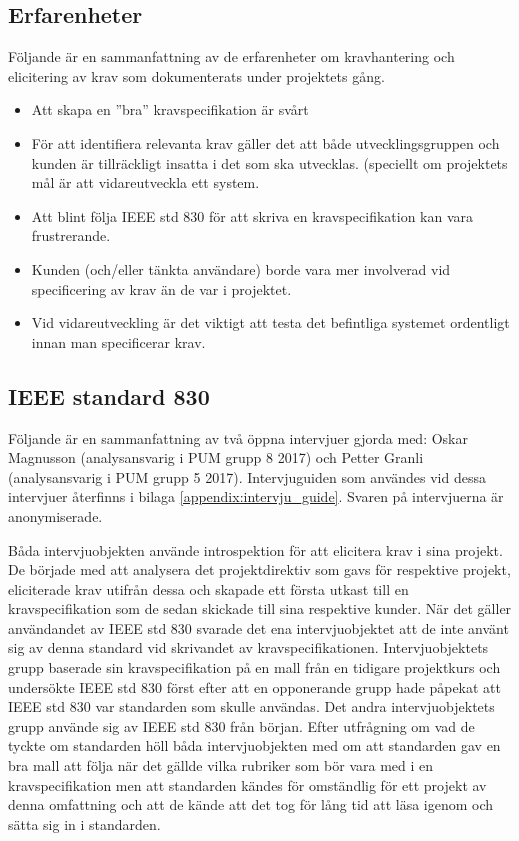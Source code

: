 \subsection{Erfarenheter}
\label{sec:expreience-jannering}
Följande är en sammanfattning av de erfarenheter om kravhantering och elicitering av krav som dokumenterats under projektets gång.
\begin{itemize}
	\item Att skapa en ”bra” kravspecifikation är svårt
	\item För att identifiera relevanta krav gäller det att både utvecklingsgruppen och kunden är tillräckligt insatta i det som ska utvecklas. (speciellt om projektets mål är att vidareutveckla ett system.
	\item Att blint följa IEEE std 830 för att skriva en kravspecifikation kan vara frustrerande.
	\item Kunden (och/eller tänkta användare) borde vara mer involverad vid specificering av krav än de var i projektet.
	\item Vid vidareutveckling är det viktigt att testa det befintliga systemet ordentligt innan man specificerar krav.
\end{itemize}

\subsection{IEEE standard 830}
Följande är en sammanfattning av två öppna intervjuer gjorda med: Oskar Magnusson (analysansvarig i PUM grupp 8 2017) och Petter Granli (analysansvarig i PUM grupp 5 2017). Intervjuguiden som användes vid dessa intervjuer återfinns i bilaga \ref{appendix:intervju_guide}. Svaren på intervjuerna är anonymiserade.  

Båda intervjuobjekten använde introspektion för att elicitera krav i sina projekt. De började med att analysera det projektdirektiv som gavs för respektive projekt, eliciterade krav utifrån dessa och skapade ett första utkast till en kravspecifikation som de sedan skickade till sina respektive kunder. När det gäller användandet av IEEE std 830 svarade det ena intervjuobjektet att de inte använt sig av denna standard vid skrivandet av kravspecifikationen. Intervjuobjektets grupp baserade sin kravspecifikation på en mall från en tidigare projektkurs och undersökte IEEE std 830 först efter att en opponerande grupp hade påpekat att IEEE std 830 var standarden som skulle användas. Det andra intervjuobjektets grupp använde sig av IEEE std 830 från början. Efter utfrågning om vad de tyckte om standarden höll båda intervjuobjekten med om att standarden gav en bra mall att följa när det gällde vilka rubriker som bör vara med i en kravspecifikation men att standarden kändes för omständlig för ett projekt av denna omfattning och att de kände att det tog för lång tid att läsa igenom och sätta sig in i standarden.          


